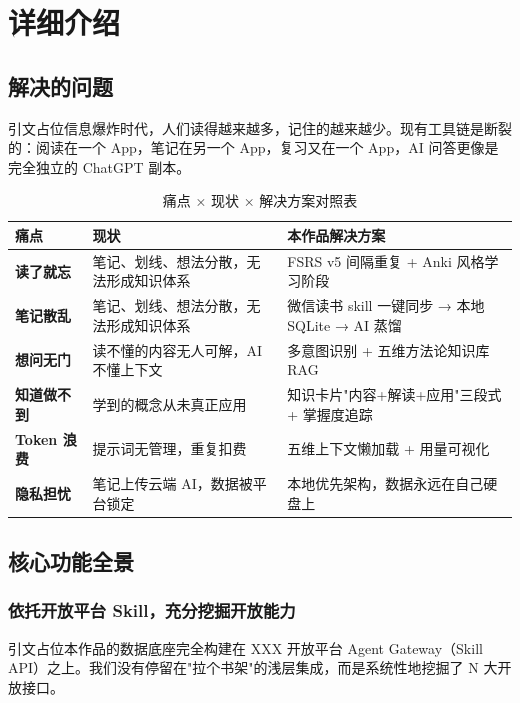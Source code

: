 \documentclass[12pt,a4paper,nomath]{harryopo-report}
\begin{document}
\chapter{详细介绍}

\section{解决的问题}
{引文占位}信息爆炸时代，人们读得越来越多，记住的越来越少。现有工具链是断裂的：阅读在一个 App，笔记在另一个 App，复习又在一个 App，AI 问答更像是完全独立的 ChatGPT 副本。

\begin{table}[htbp]
\centering
\begin{tabularx}{\textwidth}{>{\bfseries}l X X}
\toprule
\textbf{痛点} & \textbf{现状} & \textbf{本作品解决方案} \\
\midrule
读了就忘 & 笔记、划线、想法分散，无法形成知识体系 & FSRS v5 间隔重复 + Anki 风格学习阶段 \\
笔记散乱 & 笔记、划线、想法分散，无法形成知识体系 & 微信读书 skill 一键同步 → 本地 SQLite → AI 蒸馏 \\
想问无门 & 读不懂的内容无人可解，AI 不懂上下文 & 多意图识别 + 五维方法论知识库 RAG \\
知道做不到 & 学到的概念从未真正应用 & 知识卡片"内容+解读+应用"三段式 + 掌握度追踪 \\
Token 浪费 & 提示词无管理，重复扣费 & 五维上下文懒加载 + 用量可视化 \\
隐私担忧 & 笔记上传云端 AI，数据被平台锁定 & 本地优先架构，数据永远在自己硬盘上 \\
\bottomrule
\end{tabularx}
\caption{痛点 × 现状 × 解决方案对照表}
\label{tab:pains}
\end{table}

\section{核心功能全景}
\subsection{依托开放平台 Skill，充分挖掘开放能力}
{引文占位}本作品的数据底座完全构建在 XXX 开放平台 Agent Gateway（Skill API）之上。我们没有停留在"拉个书架"的浅层集成，而是系统性地挖掘了 N 大开放接口。
\end{document}
